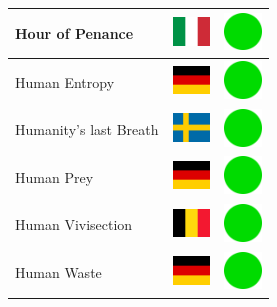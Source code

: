 \documentclass[12pt, a4paper, twoside]{report}
\begin{document}
\begin{center}
\begin{longtable}{|p{5cm}|p{2cm}|p{2cm}|}
 Hour of Penance                                            & \includegraphics[width=1cm]{../4x3/it} &   \includegraphics[width=1cm]{../likes/y} \\ \hline
 Human Entropy                                              & \includegraphics[width=1cm]{../4x3/de} &   \includegraphics[width=1cm]{../likes/y} \\ \hline
 Humanity's last Breath                                     & \includegraphics[width=1cm]{../4x3/se} &   \includegraphics[width=1cm]{../likes/y} \\ \hline
 Human Prey                                                 & \includegraphics[width=1cm]{../4x3/de} &   \includegraphics[width=1cm]{../likes/y} \\ \hline
 Human Vivisection                                          & \includegraphics[width=1cm]{../4x3/be} &   \includegraphics[width=1cm]{../likes/y} \\ \hline
 Human Waste                                                & \includegraphics[width=1cm]{../4x3/de} &   \includegraphics[width=1cm]{../likes/y} \\ \hline

\end{longtable}
\end{center}
\end{document}

